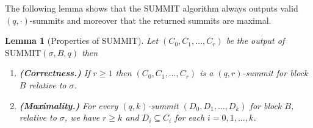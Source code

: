 \documentclass[12pt, fleqn]{article}
\newtheorem{lemma}{Lemma}
\newcommand{\summit}{\mathrm{SUMMIT}}
\begin{document}
The following lemma shows that the $\summit$ algorithm always outputs valid $(q,\cdot)$-summits and moreover that the returned summits are maximal.

\begin{lemma}[Properties of SUMMIT]
Let $(C_0, C_1, \ldots, C_r)$ be the  output of $\summit(\sigma, B, q)$ then
\begin{enumerate}
    \item {\bf (Correctness.)} If $r\geq 1$ then $(C_0, C_1, \ldots, C_r)$ is a $(q,r)$-summit for block $B$ relative to $\sigma$.
    \item {\bf (Maximality.)}  For every $(q,k)$-summit $(D_0, D_1, \ldots, D_k)$ for block $B$, relative to $\sigma$, we have $r\geq k$ and $D_i\subseteq C_i$ for each $i=0,1, \ldots, k$.
\end{enumerate}
\end{lemma}
\end{document}
